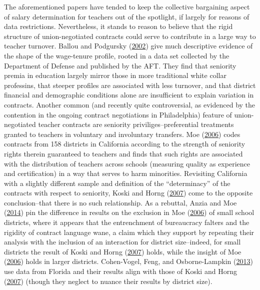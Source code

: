 \documentclass[]{article}
\begin{document}
The aforementioned papers have tended to keep the collective bargaining
aspect of salary determination for teachers out of the spotlight, if
largely for reasons of data restrictions. Nevertheless, it stands to
reason to believe that the rigid structure of union-negotiated contracts
could serve to contribute in a large way to teacher turnover. Ballou and
Podgursky (\protect\hyperlink{ref-ballou}{2002}) give much descriptive
evidence of the shape of the wage-tenure profile, rooted in a data set
collected by the Department of Defense and published by the AFT. They
find that seniority premia in education largely mirror those in more
traditional white collar professins, that steeper profiles are
associated with less turnover, and that district financial and
demographic conditions alone are insufficient to explain variation in
contracts. Another common (and recently quite controversial, as
evidenced by the contention in the ongoing contract negotiations in
Philadelphia) feature of union-negotiated teacher contracts are
seniority priviliges--preferential treatments granted to teachers in
voluntary and involuntary transfers. Moe
(\protect\hyperlink{ref-moe}{2006}) codes contracts from 158 districts
in California according to the strength of seniority rights therein
guaranteed to teachers and finds that such rights are associated with
the distribution of teachers across schools (measuring quality as
experience and certification) in a way that serves to harm minorities.
Revisiting California with a slightly different sample and definition of
the ``determinacy'' of the contracts with respect to seniority, Koski
and Horng (\protect\hyperlink{ref-koski}{2007}) come to the opposite
conclusion--that there is no such relationship. As a rebuttal, Anzia and
Moe (\protect\hyperlink{ref-anzia}{2014}) pin the difference in results
on the exclusion in Moe (\protect\hyperlink{ref-moe}{2006}) of small
school districts, where it appears that the entrenchment of bureaucracy
falters and the rigidity of contract language wane, a claim which they
support by repeating their analysis with the inclusion of an interaction
for district size--indeed, for small districts the result of Koski and
Horng (\protect\hyperlink{ref-koski}{2007}) holds, while the insight of
Moe (\protect\hyperlink{ref-moe}{2006}) holds in larger districts.
Cohen-Vogel, Feng, and Osborne-Lampkin
(\protect\hyperlink{ref-cohenvogel}{2013}) use data from Florida and
their results align with those of Koski and Horng
(\protect\hyperlink{ref-koski}{2007}) (though they neglect to nuance
their results by district size).
\end{document}
